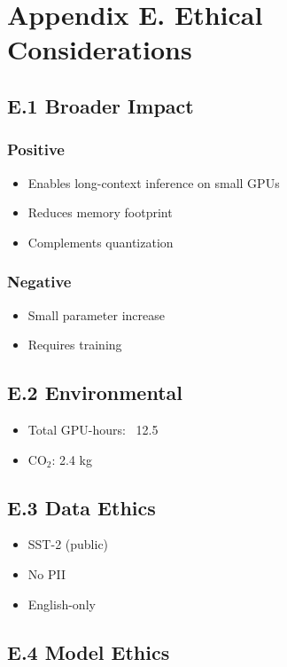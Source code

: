 \section{Appendix E. Ethical Considerations}

\subsection{E.1 Broader Impact}

\subsubsection{Positive}
\begin{itemize}
\item Enables long-context inference on small GPUs
\item Reduces memory footprint
\item Complements quantization

\end{itemize}
\subsubsection{Negative}
\begin{itemize}
\item Small parameter increase
\item Requires training

\end{itemize}
\subsection{E.2 Environmental}

\begin{itemize}
\item Total GPU-hours: ~12.5
\item CO$_2$: 2.4 kg

\end{itemize}
\subsection{E.3 Data Ethics}

\begin{itemize}
\item SST-2 (public)
\item No PII
\item English-only

\end{itemize}
\subsection{E.4 Model Ethics}


